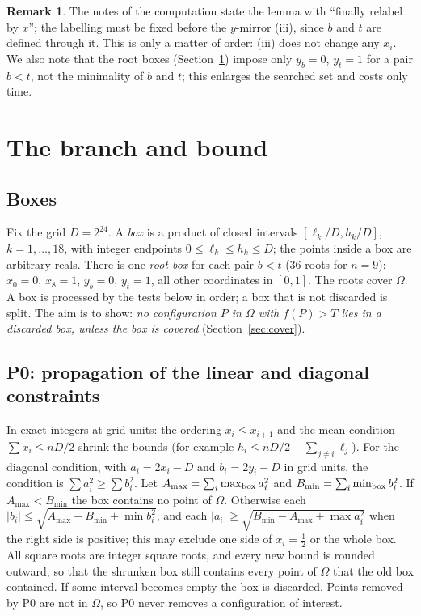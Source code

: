 \documentclass[11pt]{amsart}
\theoremstyle{definition}
\newtheorem{remark}[theorem]{Remark}
\begin{document}
\begin{remark}\label{rem:normgap}
The notes of the computation state the lemma with ``finally relabel by $x$''; the labelling must be fixed before the $y$-mirror (iii), since $b$ and $t$ are defined through it. This is only a matter of order: (iii) does not change any $x_i$. We also note that the root boxes (Section~\ref{sec:tests}) impose only $y_b = 0$, $y_t = 1$ for a pair $b < t$, not the minimality of $b$ and $t$; this enlarges the searched set and costs only time.
\end{remark}

\section{The branch and bound}\label{sec:tests}

\subsection{Boxes}
Fix the grid $D = 2^{24}$. A \emph{box} is a product of closed intervals $[\ell_k/D, h_k/D]$, $k = 1,\dots,18$, with integer endpoints $0 \le \ell_k \le h_k \le D$; the points inside a box are arbitrary reals. There is one \emph{root box} for each pair $b < t$ ($36$ roots for $n = 9$): $x_0 = 0$, $x_8 = 1$, $y_b = 0$, $y_t = 1$, all other coordinates in $[0,1]$. The roots cover $\Omega$. %
A box is processed by the tests below in order; a box that is not discarded is split. The aim is to show: \emph{no configuration $P$ in $\Omega$ with $f(P) > T$ lies in a discarded box, unless the box is covered} (Section~\ref{sec:cover}).

\subsection{P0: propagation of the linear and diagonal constraints}
In exact integers at grid units: the ordering $x_i \le x_{i+1}$ and the mean condition $\sum x_i \le nD/2$ shrink the bounds (for example $h_i \le nD/2 - \sum_{j\ne i}\ell_j$). For the diagonal condition, with $a_i = 2x_i - D$ and $b_i = 2y_i - D$ in grid units, the condition is $\sum a_i^2 \ge \sum b_i^2$. Let $A_{\max} = \sum_i \max_{\rm box} a_i^2$ and $B_{\min} = \sum_i \min_{\rm box} b_i^2$. If $A_{\max} < B_{\min}$ the box contains no point of $\Omega$. Otherwise each $|b_i| \le \sqrt{A_{\max} - B_{\min} + \min b_i^2}$, and each $|a_i| \ge \sqrt{B_{\min} - A_{\max} + \max a_i^2}$ when the right side is positive; this may exclude one side of $x_i = \frac12$ or the whole box. All square roots are integer square roots, and every new bound is rounded outward, so that the shrunken box still contains every point of $\Omega$ that the old box contained. If some interval becomes empty the box is discarded. Points removed by P0 are not in $\Omega$, so P0 never removes a configuration of interest. %
\end{document}
